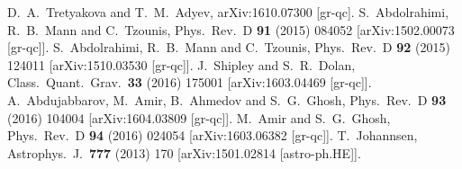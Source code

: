 \documentclass[12pt]{article}
\begin{document}
\begin{small}
\begin{thebibliography}{99}
  D.~A.~Tretyakova and T.~M.~Adyev,
  arXiv:1610.07300 [gr-qc].
  S.~Abdolrahimi, R.~B.~Mann and C.~Tzounis,
  Phys.\ Rev.\ D {\bf 91} (2015)   084052
  [arXiv:1502.00073 [gr-qc]].
  S.~Abdolrahimi, R.~B.~Mann and C.~Tzounis,
  Phys.\ Rev.\ D {\bf 92} (2015) 124011
  [arXiv:1510.03530 [gr-qc]].
  J.~Shipley and S.~R.~Dolan,
  Class.\ Quant.\ Grav.\  {\bf 33} (2016)   175001
  [arXiv:1603.04469 [gr-qc]].
  A.~Abdujabbarov, M.~Amir, B.~Ahmedov and S.~G.~Ghosh,
  Phys.\ Rev.\ D {\bf 93} (2016)   104004
  [arXiv:1604.03809 [gr-qc]].
  M.~Amir and S.~G.~Ghosh,
  Phys.\ Rev.\ D {\bf 94} (2016)   024054
  [arXiv:1603.06382 [gr-qc]].
  T.~Johannsen,
  Astrophys.\ J.\  {\bf 777} (2013) 170
  [arXiv:1501.02814 [astro-ph.HE]].


\end{thebibliography}
\end{small}
\end{document}
